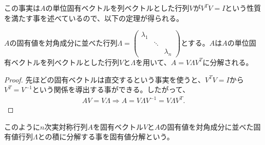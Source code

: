 この事実は$A$の単位固有ベクトルを列ベクトルとした行列$V$が$V^T V = I$という性質を満たす事を述べているので、以下の定理が得られる。
\begin{theorem}
  $A$の固有値を対角成分に並べた行列$\Lambda = \displaystyle{\left(\begin{array}{ccc} \lambda_1 & & \\ & \ddots & \\ & & \lambda_n \end{array}\right)}$とする。$A$は$A$の単位固有ベクトルを列ベクトルとした行列$V$と$\Lambda$を用いて、$A = V \Lambda V^T$に分解される。
\end{theorem}
\begin{proof}
  先ほどの固有ベクトルは直交するという事実を使うと、$V^T V = I$から$V^T = V^{-1}$という関係を導出する事ができる。したがって、
  \begin{align*}
    A V = V \Lambda \Rightarrow A = V \Lambda V^{-1} = V \Lambda V^T.
  \end{align*}
\end{proof}

このように$n$次実対称行列$A$を固有ベクトル$V$と$A$の固有値を対角成分に並べた固有値行列$\Lambda$との積に分解する事を固有値分解という。

